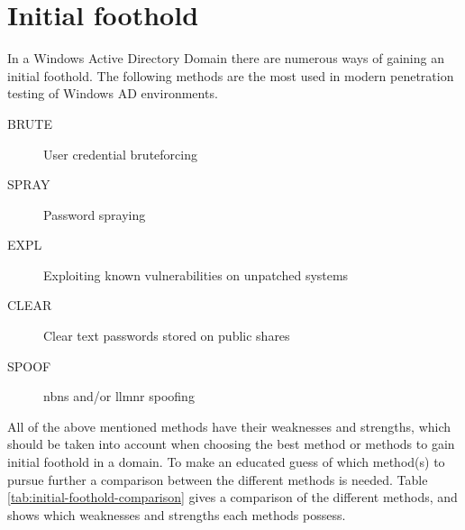 \documentclass{article}
\begin{document}
\section{Initial foothold}
In a Windows Active Directory Domain there are numerous ways of gaining an initial foothold. The following methods are the most used in modern penetration testing of Windows AD environments.
\begin{description}
	\item[BRUTE] User credential bruteforcing
	\item[SPRAY] Password spraying
	\item[EXPL]Exploiting known vulnerabilities on unpatched systems
	\item[CLEAR] Clear text passwords stored on public shares
	\item[SPOOF] \gls{nbns} and/or \gls{llmnr} spoofing
\end{description}

All of the above mentioned methods have their weaknesses and strengths, which should be taken into account when choosing the best method or methods to gain initial foothold in a domain. To make an educated guess of which method(s) to pursue further a comparison between the different methods is needed. Table \ref{tab:initial-foothold-comparison} gives a comparison of the different methods, and shows which weaknesses and strengths each methods possess.
\end{document}
